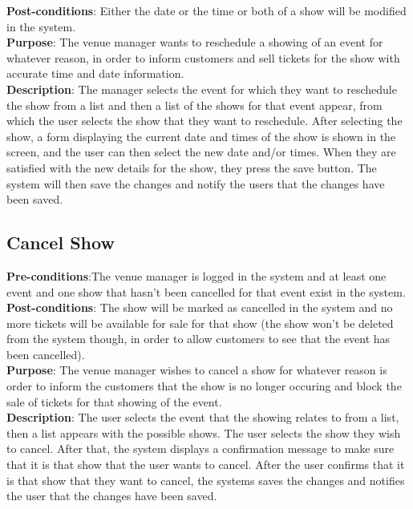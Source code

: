 \textbf{Post-conditions}: Either the date or the time or both of a show
will be modified in the system.\\

\textbf{Purpose}: The venue manager wants to reschedule a showing of
an event for whatever reason, in order to inform customers and sell
tickets for the show with accurate time and date information.\\

\textbf{Description}: The manager selects the event for which they want
to reschedule the show from a list and then a list of the shows for that
event appear, from which the user selects the show that they want to
reschedule. After selecting the show, a form displaying the current date
and times of the show is shown in the screen, and the user can then select the
new date and/or times. When they are satisfied with the new details for
the show, they press the save button. The system will then save the changes
and notify the users that the changes have been saved.

\subsection{Cancel Show}
\textbf{Pre-conditions}:The venue manager is logged in the system and at
least one event and one show that hasn't been cancelled for that event
exist in the system.\\

\textbf{Post-conditions}: The show will be marked as cancelled in the system
and no more tickets will be available for sale for that show (the show
won't be deleted from the system though, in order to allow customers
to see that the event has been cancelled).\\

\textbf{Purpose}: The venue manager wishes to cancel a show for whatever
reason is order to inform the customers that the show is no longer
occuring and block the sale of tickets for that showing of the event.\\

\textbf{Description}: The user selects the event that the showing
relates to from a list, then a list appears with the possible shows.
The user selects the show they wish to cancel. After that, the system
displays a confirmation message to make sure that it is that show that
the user wants to cancel. After the user confirms that it is that show
that they want to cancel, the systems saves the changes and notifies
the user that the changes have been saved.


